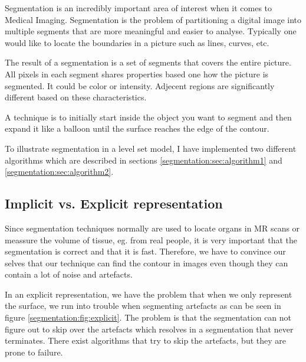 
Segmentation is an incredibly important area of interest when it comes
to Medical Imaging. Segmentation is the problem of partitioning a
digital image into multiple segments that are more meaningful and
easier to analyse. Typically one would like to locate the boundaries
in a picture such as lines, curves, etc.

The result of a segmentation is a set of segments that covers the
entire picture. All pixels in each segment shares properties based one
how the picture is segmented. It could be color or intensity. Adjecent
regions are significantly different based on these characteristics.

A technique is to initially start inside the object you want to
segment and then expand it like a balloon until the surface reaches
the edge of the contour.

To illustrate segmentation in a level set model, I have implemented
two different algorithms which are described in sections
\vref{segmentation:sec:algorithm1} and
\vref{segmentation:sec:algorithm2}.

\subsection{Implicit vs. Explicit representation}

Since segmentation techniques normally are used to locate organs in MR
scans or meassure the volume of tissue, eg. from real people, it is
very important that the segmentation is correct and that it is
fast. Therefore, we have to convince our selves that our technique can
find the contour in images even though they can contain a lot of noise
and artefacts.

In an explicit representation, we have the problem that when we only
represent the surface, we run into trouble when segmenting artefacts
as can be seen in figure \vref{segmentation:fig:explicit}. The problem
is that the segmentation can not figure out to skip over the artefacts
which resolves in a segmentation that never terminates. There exist
algorithms that try to skip the artefacts, but they are prone to
failure.


